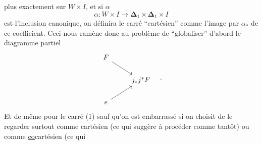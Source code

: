 \documentclass[11pt]{article}
\newcommand{\msp}[1]{\marginpar{\footnotesize [#1]}}
\newcommand{\Del}{\boldsymbol{\Delta}}
\begin{document}
\msp{page 10}

plus exactement sur $W \times I$, et si $\alpha$
\[ \alpha : W \times I \longrightarrow \Del_1 \times \Del_1 \times I \]
est l'inclusion canonique, on définira le carré “cartésien” comme l'image par $\alpha_*$ de ce coefficient. Ceci nous ramène donc au problème de “globaliser” d'abord le diagramme partiel
\[
\begin{tikzcd}
F \arrow[dr] & \\
& j_*j^*F \\
e \arrow[ur] &
\end{tikzcd}
\quad .
\]
Et de même pour le carré (1) sauf qu'on est embarrassé si on choisit de le regarder surtout comme cartésien (ce qui suggère à procéder comme tantôt) ou comme \underline{co}cartésien (ce qui %
\end{document}
